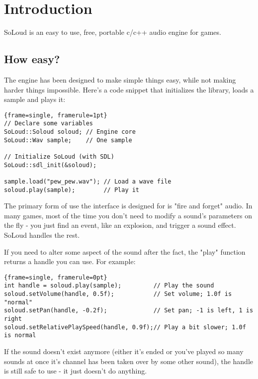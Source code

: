 
\chapter{Introduction}

SoLoud is an easy to use, free, portable c/c++ audio engine for games.

\section {How easy?}
The engine has been designed to make simple things easy, while not making harder things impossible. Here's a code snippet that initializes the library, loads a sample and plays it:

\begin{lstlisting}{frame=single, framerule=1pt}
// Declare some variables
SoLoud::Soloud soloud; // Engine core
SoLoud::Wav sample;    // One sample

// Initialize SoLoud (with SDL)
SoLoud::sdl_init(&soloud);

sample.load("pew_pew.wav"); // Load a wave file
soloud.play(sample);        // Play it
\end{lstlisting}

The primary form of use the interface is designed for is "fire and forget" audio. In many games, most of the time you don't need to modify a sound's parameters on the fly - you just find an event, like an explosion, and trigger a sound effect. SoLoud handles the rest.

If you need to alter some aspect of the sound after the fact, the "play" function returns a handle you can use. For example:

\begin{lstlisting}{frame=single, framerule=0pt}
int handle = soloud.play(sample);         // Play the sound
soloud.setVolume(handle, 0.5f);           // Set volume; 1.0f is "normal"
soloud.setPan(handle, -0.2f);             // Set pan; -1 is left, 1 is right
soloud.setRelativePlaySpeed(handle, 0.9f);// Play a bit slower; 1.0f is normal
\end{lstlisting}

If the sound doesn't exist anymore (either it's ended or you've played so many sounds at once it's channel has been taken over by some other sound), the handle is still safe to use - it just doesn't do anything.


